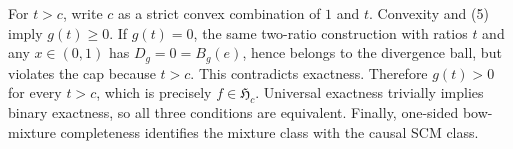 For \(t>c\), write \(c\) as a strict convex combination of \(1\) and \(t\).  Convexity and (5) imply \(g(t)\ge0\).  If \(g(t)=0\), the same two-ratio construction with ratios \(t\) and any \(x\in(0,1)\) has \(D_g=0=B_g(e)\), hence belongs to the divergence ball, but violates the cap because \(t>c\).  This contradicts exactness.  Therefore \(g(t)>0\) for every \(t>c\), which is precisely \(f\in\mathfrak H_c\).  Universal exactness trivially implies binary exactness, so all three conditions are equivalent.  Finally, one-sided bow-mixture completeness identifies the mixture class with the causal SCM class.